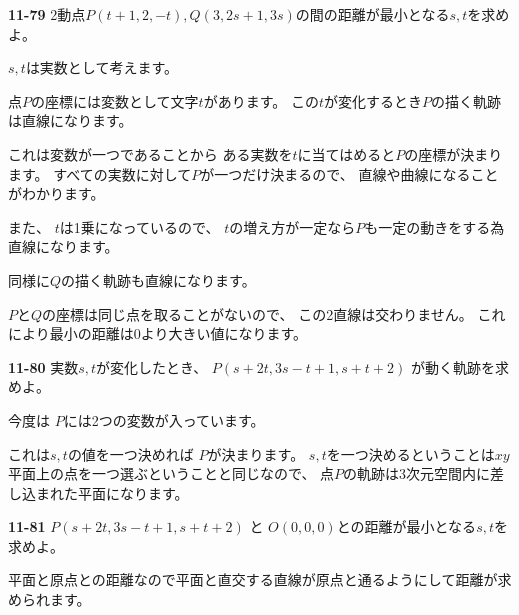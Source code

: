 \documentclass[12pt,b5paper]{ltjsarticle}
\begin{document}
\textbf{11-79}
2動点$P(t+1,2,-t), Q(3, 2s+1, 3s)$の間の距離が最小となる$s,t$を求めよ。

\dotfill


$s, t$は実数として考えます。

点$P$の座標には変数として文字$t$があります。
この$t$が変化するとき$P$の描く軌跡は直線になります。

これは変数が一つであることから
ある実数を$t$に当てはめると$P$の座標が決まります。
すべての実数に対して$P$が一つだけ決まるので、
直線や曲線になることがわかります。

また、
$t$は1乗になっているので、
$t$の増え方が一定なら$P$も一定の動きをする為直線になります。

同様に$Q$の描く軌跡も直線になります。

$P$と$Q$の座標は同じ点を取ることがないので、
この2直線は交わりません。
これにより最小の距離は0より大きい値になります。

\hrulefill

\textbf{11-80}
実数$s,t$が変化したとき、
$P(s+2t, 3s-t+1, s+t+2)$
が動く軌跡を求めよ。

\dotfill

今度は $P$には2つの変数が入っています。

これは$s,t$の値を一つ決めれば $P$が決まります。
$s,t$を一つ決めるということは$xy$平面上の点を一つ選ぶということと同じなので、
点$P$の軌跡は3次元空間内に差し込まれた平面になります。


\hrulefill

\textbf{11-81}
$P(s+2t, 3s-t+1, s+t+2)$ と $O(0, 0, 0)$との距離が最小となる$s,t$を求めよ。

\dotfill

平面と原点との距離なので平面と直交する直線が原点と通るようにして距離が求められます。
\end{document}
